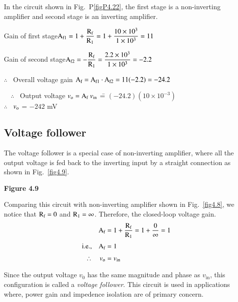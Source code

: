 \begin{solution}
In the circuit shown in Fig.~P\ref{figP4.22}, the first stage is a non-inverting amplifier and second stage is an inverting amplifier.

\medskip
Gain of first stage\quad $\textrm{A}_{\textrm{f} 1}=1+\dfrac{\textrm{R}_{\textrm{f}}}{\textrm{R}_{1}}=1+\dfrac{10\times 10^{3}}{1\times 10^{3}}=11$

\medskip
Gain of second stage\quad $\textrm{A}_{\textrm{f} 2}=-\dfrac{\textrm{R}_{\textrm{f}}}{\textrm{R}_{1}}=\dfrac{2.2\times 10^{3}}{1\times 10^{3}}=-2.2$

\medskip
$\therefore$~ Overall voltage gain $\textrm{A}_{\textrm{f}}=\textrm{A}_{\textrm{f} 1}\cdot \textrm{A}_{\textrm{f} 2}=11(-2.2)=-24.2$

\medskip
\begin{tabbing}
\quad~~$\therefore$~ Output voltage $v_{\textrm{o}}=\textrm{A}_{\textrm{f}}~v_{\text{in}}$ \== $(-24.2)(10\times 10^{-3})$\\[4pt]
\phantom{AAiAAAAAAAAAAAAA} $\therefore$~ $v_{\textrm{o}}$ \>= $-242$ mV
\end{tabbing}
\end{solution}

\subsection{Voltage follower}\label{sec4.6.3}

The voltage follower is a special case of non-inverting amplifier, where all the output voltage is fed back to the inverting input by a straight connection as shown in Fig.~\ref{fig4.9}.
\begin{center}
{\bf Figure 4.9}
\end{center}

Comparing this circuit with non-inverting amplifier shown in Fig.~\ref{fig4.8}, we notice that $\textrm{R}_{\textrm{f}}=0$ and $\textrm{R}_{1}=\infty$. Therefore, the closed-loop voltage gain.
\begin{align}
\textrm{A}_{\textrm{f}} &= 1+\frac{\textrm{R}_{\textrm{f}}}{\textrm{R}_{1}}=1+\frac{0}{\infty}=1\notag\\[3pt]
\text{i.e.,}\quad \textrm{A}_{\textrm{f}} &=1\label{eq4.28}\\[3pt]
\therefore\quad v_{\textrm{o}} &= v_{\text{in}}\notag
\end{align}

Since the output voltage $v_{0}$ has the same magnitude and phase as $v_{\text{in}}$, this configuration is called a {\em voltage follower}. This circuit is used in applications where, power gain and impedence isolation are of primary concern.


